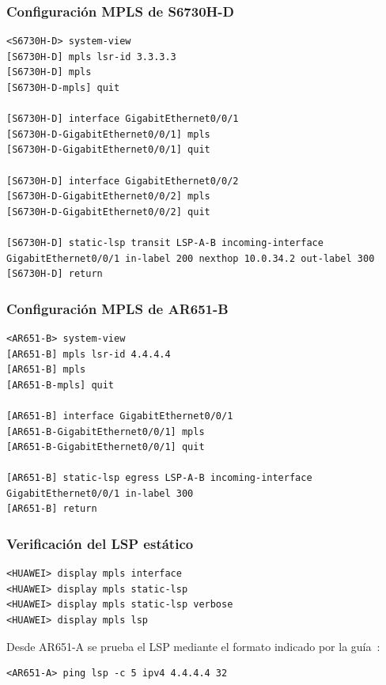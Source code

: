 \subsubsection{Configuración MPLS de S6730H-D}

\begin{lstlisting}[style=terminal]
<S6730H-D> system-view
[S6730H-D] mpls lsr-id 3.3.3.3
[S6730H-D] mpls
[S6730H-D-mpls] quit

[S6730H-D] interface GigabitEthernet0/0/1
[S6730H-D-GigabitEthernet0/0/1] mpls
[S6730H-D-GigabitEthernet0/0/1] quit

[S6730H-D] interface GigabitEthernet0/0/2
[S6730H-D-GigabitEthernet0/0/2] mpls
[S6730H-D-GigabitEthernet0/0/2] quit

[S6730H-D] static-lsp transit LSP-A-B incoming-interface GigabitEthernet0/0/1 in-label 200 nexthop 10.0.34.2 out-label 300
[S6730H-D] return
\end{lstlisting}

\subsubsection{Configuración MPLS de AR651-B}

\begin{lstlisting}[style=terminal]
<AR651-B> system-view
[AR651-B] mpls lsr-id 4.4.4.4
[AR651-B] mpls
[AR651-B-mpls] quit

[AR651-B] interface GigabitEthernet0/0/1
[AR651-B-GigabitEthernet0/0/1] mpls
[AR651-B-GigabitEthernet0/0/1] quit

[AR651-B] static-lsp egress LSP-A-B incoming-interface GigabitEthernet0/0/1 in-label 300
[AR651-B] return
\end{lstlisting}

\subsubsection{Verificación del LSP estático}

\begin{lstlisting}[style=terminal]
<HUAWEI> display mpls interface
<HUAWEI> display mpls static-lsp
<HUAWEI> display mpls static-lsp verbose
<HUAWEI> display mpls lsp
\end{lstlisting}

Desde AR651-A se prueba el LSP mediante el formato indicado por la guía~\cite[tarea~2.4]{guia-mpls-ar651-s6730h}:

\begin{lstlisting}[style=terminal]
<AR651-A> ping lsp -c 5 ipv4 4.4.4.4 32
\end{lstlisting}

